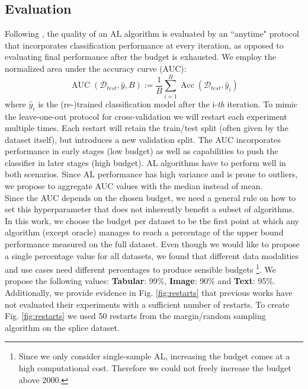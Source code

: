 \documentclass[]{article}
\begin{document}
\subsection{Evaluation}\label{sec:evaluation}
Following \cite{zhou2021towards}, the quality of an AL algorithm is evaluated by an ``anytime" protocol that incorporates classification performance at every iteration, as opposed to evaluating final performance after the budget is exhausted.
We employ the normalized area under the accuracy curve (AUC):
\begin{equation}\label{eq:auc}
	\operatorname{AUC}(\mathcal{D}_{test}, \hat y, B) := \frac{1}{B} \sum_{i=1}^{B} \operatorname{Acc}(\mathcal{D}_{test}, \hat y_i)
\end{equation}
where $\hat y_i$ is the (re-)trained classification model after the i-\textit{th} iteration.
To mimic the leave-one-out protocol for cross-validation we will restart each experiment multiple times.
Each restart will retain the train/test split (often given by the dataset itself), but introduces a new validation split.
The AUC incorporates performance in early stages (low budget) as well as capabilities to push the classifier in later stages (high budget).
AL algorithms have to perform well in both scenarios. 
Since AL performance has high variance and is prone to outliers, we propose to aggregate AUC values with the median instead of mean. \\ [1mm]
Since the AUC depends on the chosen budget, we need a general rule on how to set this hyperparameter that does not inherently benefit a subset of algorithms.
In this work, we choose the budget per dataset to be the first point at which any algorithm (except oracle) manages to reach a percentage of the upper bound performance measured on the full dataset.
Even though we would like to propose a single percentage value for all datasets, we found that different data modalities and use cases need different percentages to produce sensible budgets
\footnote{Since we only consider single-sample AL, increasing the budget comes at a high computational cost. Therefore we could not freely increase the budget above 2000.}.
We propose the following values: \textbf{Tabular}: 99\%, \textbf{Image}: 90\% and \textbf{Text}: 95\%. \\ [1mm]
Additionally, we provide evidence in Fig. \ref{fig:restarts} that previous works have not evaluated their experiments with a sufficient number of restarts.
To create Fig. \ref{fig:restarts} we used 50 restarts from the margin/random sampling algorithm on the splice dataset.
\end{document}
